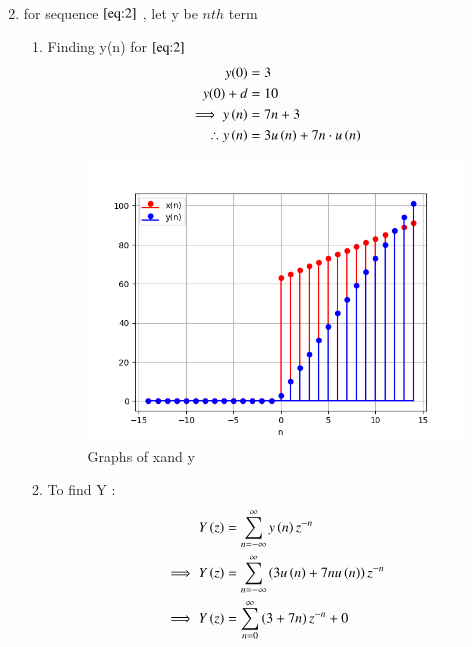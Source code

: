 \documentclass[journal,12pt,twocolumn]{IEEEtran}
\theoremstyle{remark}
\begin{document}
\begin{enumerate}
\begin{enumerate}
\begin{align}
\end{align}
\end{enumerate}
\item
for sequence $ \eqref{eq:2}$ , let y be $ nth$ term\\
\begin{enumerate}
\item 
Finding y(n) for $ \eqref{eq:2}$
\begin{align}
y(0) &= 3 \\
y(0)+d &= 10\\
\implies y\left(n\right) &= 7n + 3 \label{eq:4}\\
\therefore y\left(n\right) &= 3u\left(n\right) + 7n\cdot u\left(n\right) \label{eq:4}
\end{align}

\begin{figure}[ht]
    \includegraphics[width = \linewidth]{Figure_1.png}
    \caption{Graphs of xand y}
    \label{Fig:1}
\end{figure}
\item
To find Y :\\
\begin{align}
Y\left(z\right) &= \sum_{n=-\infty}^{\infty} y\left(n\right)z^{-n}\\
\implies Y\left(z\right) &= \sum_{n=-\infty}^{\infty} \left(3u\left(n\right) + 7nu\left(n\right)\right)z^{-n}\\
\implies Y\left(z\right) &= \sum_{n=0}^{\infty} \left(3 + 7n\right)z^{-n} + 0
\end{align}


\end{enumerate}
\end{enumerate}
\end{document}
